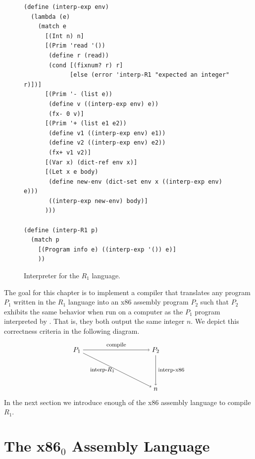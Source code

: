\documentclass[11pt]{book}
\begin{document}
\begin{figure}[tp]
\begin{lstlisting}
(define (interp-exp env)
  (lambda (e)
    (match e
      [(Int n) n]
      [(Prim 'read '())
       (define r (read))
       (cond [(fixnum? r) r]
             [else (error 'interp-R1 "expected an integer" r)])]
      [(Prim '- (list e))
       (define v ((interp-exp env) e))
       (fx- 0 v)]
      [(Prim '+ (list e1 e2))
       (define v1 ((interp-exp env) e1))
       (define v2 ((interp-exp env) e2))
       (fx+ v1 v2)]
      [(Var x) (dict-ref env x)]
      [(Let x e body)
       (define new-env (dict-set env x ((interp-exp env) e)))
       ((interp-exp new-env) body)]
      )))

(define (interp-R1 p)
  (match p
    [(Program info e) ((interp-exp '()) e)]
    ))
\end{lstlisting}
\caption{Interpreter for the $R_1$ language.}
\label{fig:interp-R1}
\end{figure}

The goal for this chapter is to implement a compiler that translates
any program $P_1$ written in the $R_1$ language into an x86 assembly
program $P_2$ such that $P_2$ exhibits the same behavior when run on a
computer as the $P_1$ program interpreted by .  That
is, they both output the same integer $n$. We depict this correctness
criteria in the following diagram.
\[
\begin{tikzpicture}[baseline=(current  bounding  box.center)]
 \node (p1) at (0,  0)   {$P_1$};
 \node (p2) at (4,  0)   {$P_2$};
 \node (o)  at (4, -2) {$n$};

 \path[->] (p1) edge [above] node {\footnotesize compile} (p2);
 \path[->] (p1) edge [left]  node {\footnotesize interp-$R_1$} (o);
 \path[->] (p2) edge [right] node {\footnotesize interp-x86} (o);
\end{tikzpicture}
\]
In the next section we introduce enough of the x86 assembly
language to compile $R_1$.

\section{The x86$_0$ Assembly Language}
\label{sec:x86}
\end{document}

